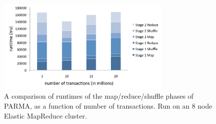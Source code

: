 \begin{figure}[htb]
\centering
    \includegraphics[width=0.75\textwidth]{parma/breakdown1}
  \caption{A comparison of runtimes of the map/reduce/shuffle phases
of PARMA, as a function of number of transactions. Run on
an 8 node Elastic MapReduce cluster.}
\label{fig:parmabreakdown1}
\end{figure}

